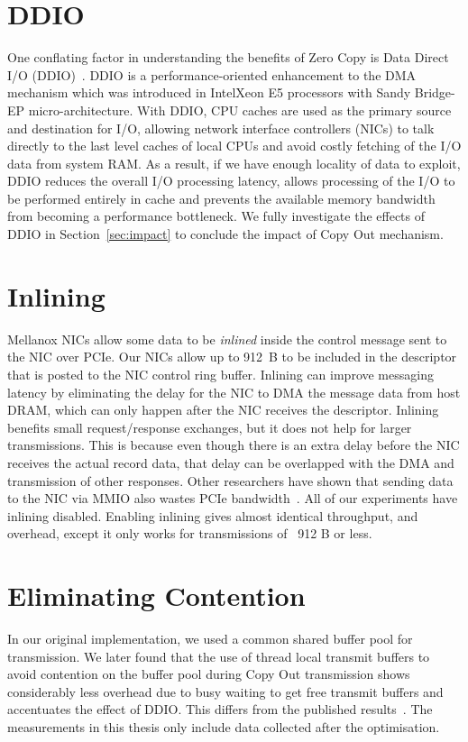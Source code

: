 \section{DDIO}
One conflating factor in understanding the benefits of Zero Copy is Data Direct I/O (DDIO)~\cite{ddio}.
 DDIO is a performance-oriented enhancement to the DMA mechanism which was introduced in Intel\textregistered Xeon E5 processors with Sandy Bridge-EP micro-architecture.
 With DDIO, CPU caches are used as the primary source and destination for I/O, 
allowing network interface controllers (NICs) to talk directly to the last level caches of local CPUs
and avoid costly fetching of the I/O data from system RAM. As a result, if we have enough locality of data to exploit,
DDIO reduces the overall I/O processing latency, allows processing of the I/O 
to be performed entirely in cache and prevents the available memory bandwidth from becoming a performance bottleneck.
We fully investigate the effects of DDIO in Section~\ref{sec:impact} to conclude the impact of 
Copy Out mechanism.


\section{Inlining}
Mellanox NICs allow some data to be {\em inlined} inside the control message
sent to the NIC over PCIe. Our NICs allow up to 912~B to be included in the
descriptor that is posted to the NIC control ring buffer.  Inlining can improve
messaging latency by eliminating the delay for the NIC to DMA the message data
from host DRAM, which can only happen after the NIC receives the descriptor.
Inlining benefits small request/response exchanges, but it does not help for
larger transmissions. This is because even though there is an extra delay
before the NIC receives the actual record data, that delay can be overlapped
with the DMA and transmission of other responses. Other researchers have shown
that sending data to the NIC via MMIO also wastes PCIe bandwidth~\cite{rdma}.
All of our experiments have inlining disabled. Enabling inlining gives almost 
identical throughput, and overhead, except it only works for transmissions of ~912 B or less.

\section{Eliminating Contention}
\label{sec:code-optimisation}
In our original implementation, we used a common shared buffer pool for transmission.
We later found that the use of thread local transmit buffers to avoid contention on the buffer pool during 
Copy Out transmission shows considerably less overhead due to busy waiting to get free transmit buffers 
and accentuates the effect of DDIO. This differs from the published results~\cite{imdmpaper}. 
The measurements in this thesis only include data collected after the optimisation.

